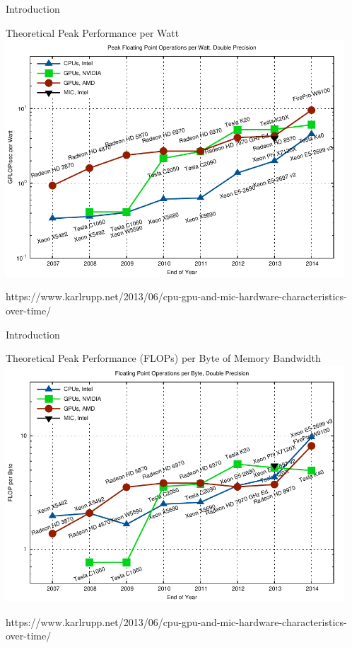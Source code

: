 \begin{frame}{Introduction}
 \vspace*{-0.5cm}
 \begin{center}
  Theoretical Peak Performance per Watt \\
  \includegraphics[width=0.95\textwidth]{figures/gflops-per-watt-dp}
 \end{center}
 \vspace*{-0.5cm}
 {\tiny https://www.karlrupp.net/2013/06/cpu-gpu-and-mic-hardware-characteristics-over-time/ }
\end{frame}

\begin{frame}{Introduction}
 \vspace*{-0.5cm}
 \begin{center}
  Theoretical Peak Performance (FLOPs) per Byte of Memory Bandwidth \\
  \includegraphics[width=0.95\textwidth]{figures/flop-per-byte-dp}
 \end{center}
 \vspace*{-0.5cm}
 {\tiny https://www.karlrupp.net/2013/06/cpu-gpu-and-mic-hardware-characteristics-over-time/ }
\end{frame}




